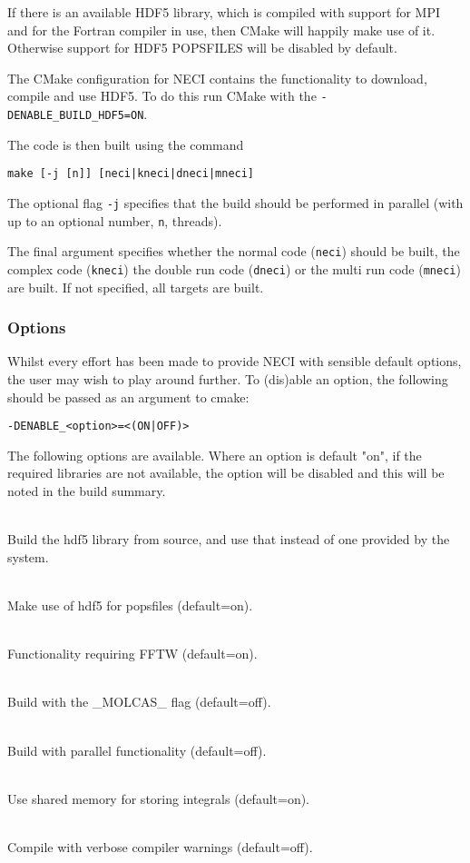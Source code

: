 \documentclass[a4paper,notitlepage]{scrreprt}
\newcommand\codeitem[1]{\needspace{1.5\baselineskip}\item[\textnormal{\ttfamily #1 \nopagebreak}] \hfill \\ \nopagebreak}
\let\code\lstinline
\begin{document}
	\begin{mdframed}[ %
		linewidth = 2pt, %
		linecolor = red, %
		roundcorner = 6pt, %
		leftmargin = 10, %
		rightmargin = 10, %
		backgroundcolor = gray!20
	]
	If there is an available HDF5 library, which is compiled with support for
	MPI and for the Fortran compiler in use, then CMake will happily make use
	of it. Otherwise support for HDF5 POPSFILES will be disabled by default.

	The CMake configuration for NECI contains the functionality to download,
	compile and use HDF5. To do this run CMake with the
    \code{-DENABLE_BUILD_HDF5=ON}.
	\end{mdframed}

	The code is then built using the command
	\begin{lstlisting}[gobble=4]
		make [-j [n]] [neci|kneci|dneci|mneci]
	\end{lstlisting}
	The optional flag \code{-j} specifies that the build should be
	performed in parallel (with up to an optional number, \code{n},
	threads).

	The final argument specifies whether the normal code (\code{neci})
	should be built, the complex code (\code{kneci}) the double run
	code (\code{dneci}) or the multi run code (\code{mneci}) are
	built. If not specified, all targets are built.

\subsubsection{Options}
    Whilst every effort has been made to provide NECI with sensible default options, the user
    may wish to play around further. To (dis)able an option, the following should be passed as
    an argument to cmake:
    \begin{lstlisting}[gobble=4]
        -DENABLE_<option>=<(ON|OFF)>
    \end{lstlisting}
    The following options are available. Where an option is default "on", if the required libraries
    are not available, the option will be disabled and this will be noted in the build summary.
    \begin{description}
        \codeitem{BUILD\_HDF5}
            Build the hdf5 library from source, and use that instead of one provided by the system.
        \codeitem{HDF5}
            Make use of hdf5 for popsfiles (default=on).
        \codeitem{FFTW}
            Functionality requiring FFTW (default=on).
        \codeitem{MOLCAS}
            Build with the \_MOLCAS\_ flag (default=off).
        \codeitem{MPI}
            Build with parallel functionality (default=off).
        \codeitem{SHARED\_MEMORY}
            Use shared memory for storing integrals (default=on).
        \codeitem{WARNINGS}
            Compile with verbose compiler warnings (default=off).
    \end{description}
\end{document}
